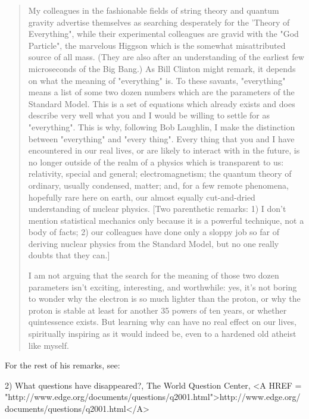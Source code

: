 \begin{quote}
     My colleagues in the fashionable fields of string theory and 
     quantum gravity advertise themselves as searching desperately 
     for the 'Theory of Everything", while their experimental colleagues 
     are gravid with the "God Particle", the marvelous Higgson which 
     is the somewhat misattributed source of all mass.  (They are also 
     after an understanding of the earliest few microseconds of the Big 
     Bang.) As Bill Clinton might remark, it depends on what the meaning 
     of "everything" is.  To these savants, "everything" means a list of 
     some two dozen numbers which are the parameters of the Standard Model. 
     This is a set of equations which already exists and does describe very 
     well what you and I would be willing to settle for as "everything". 
     This is why, following Bob Laughlin, I make the distinction between 
     "everything" and "every thing".  Every thing that you and I have 
     encountered in our real lives, or are likely to interact with in 
     the future, is no longer outside of the realm of a physics which is 
     transparent to us: relativity, special and general; electromagnetism; 
     the quantum theory of ordinary, usually condensed, matter; and, for
     a few remote phenomena, hopefully rare here on earth, our almost 
     equally cut-and-dried understanding of nuclear physics.  [Two 
     parenthetic remarks: 1) I don't mention statistical mechanics 
     only because it is a powerful technique, not a body of facts; 
     2) our colleagues have done only a sloppy job so far of deriving 
     nuclear physics from the Standard Model, but no one really doubts 
     that they can.]

     I am not arguing that the search for the meaning of those two 
     dozen parameters isn't exciting, interesting, and worthwhile: 
     yes, it's not boring to wonder why the electron is so much 
     lighter than the proton, or why the proton is stable at least 
     for another 35 powers of ten years, or whether quintessence exists. 
     But learning why can have no real effect on our lives, spiritually 
     inspiring as it would indeed be, even to a hardened old atheist 
     like myself.
\end{quote}
For the rest of his remarks, see:

2) What questions have disappeared?, The World Question Center,
<A HREF = "http://www.edge.org/documents/questions/q2001.html">http://www.edge.org/documents/questions/q2001.html</A>

